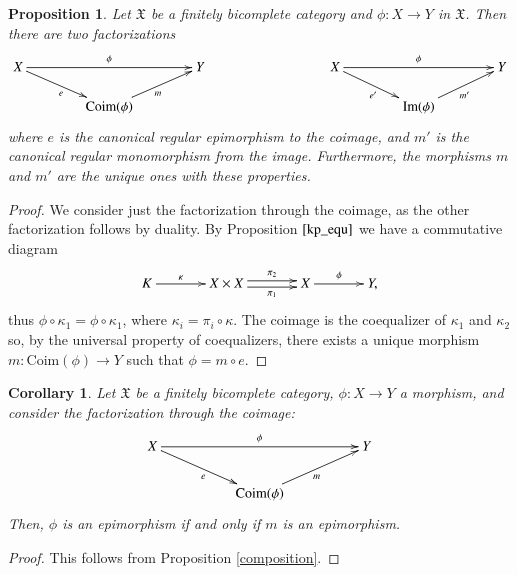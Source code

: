 \documentclass[12pt]{article}
\newtheorem{proposition}[lemma]{Proposition}
\newtheorem{corollary}[lemma]{Corollary}
\theoremstyle{definition}
\def\X{\mathfrak X}
\def\Coim{\mathrm{Coim}}
\def\Im{\mathrm{Im}}
\numberwithin{equation}{section}
\begin{document}
\begin{proposition}
Let $\X$ be a finitely bicomplete category and $\phi\colon X\to Y$ in $\X$. Then there are two factorizations
\[
\xymatrix@C=40pt@R=15pt{
X \ar[rr]^\phi\ar[dr]_{e}&  & Y &&X \ar[rr]^\phi\ar[dr]_{e'}&  & Y \\ 
& \Coim(\phi) \ar[ur]_{m} &&&& \Im(\phi) \ar[ur]_{m'} & 
}
\]
where $e$ is the canonical regular epimorphism to the coimage, and $m'$ is the canonical regular monomorphism from the image. Furthermore, the morphisms $m$ and $m'$ are the unique ones with these properties.
\end{proposition}
\begin{proof}
We consider just the factorization through the coimage, as the other factorization follows by duality. By Proposition $\ref{kp_equ}$ we have a commutative diagram
\[
\xymatrix@C=35pt{
K\ar[r]^-\kappa& X\times X \ar@<-.5ex>[r]_-{\pi_1} \ar@<.5ex>[r]^-{\pi_2} &X\ar[r]^{\phi}&Y,
}
\]
thus $\phi\circ\kappa_1=\phi \circ \kappa_1$, where  $\kappa_i=\pi_i\circ\kappa$.
The coimage is the coequalizer of $\kappa_1$ and $\kappa_2$ so, by the universal property of coequalizers, there exists a unique morphism $m\colon \Coim(\phi)\to Y$ such that $\phi=m\circ e$.
\end{proof}

\begin{corollary}\label{epiepi}
Let $\X$ be a finitely bicomplete category, $\phi\colon X\to Y$ a morphism, and consider the factorization through the coimage:
\[
\xymatrix@R=20pt@C=50pt{
X\ar[rr]^{\phi}\ar[dr]_e&&Y\\
&\Coim(\phi)\ar[ur]_m
}
\] 
Then, $\phi$ is an epimorphism if and only if $m$ is an epimorphism. 
\end{corollary}
\begin{proof} 
This follows from Proposition \ref{composition}.
\end{proof}
\end{document}
